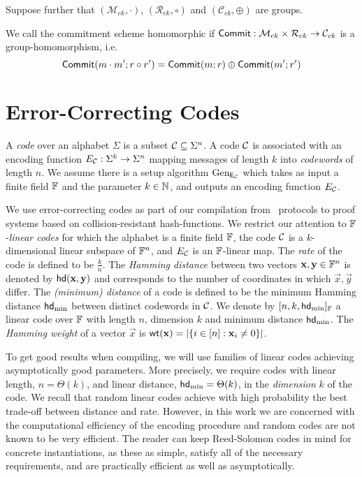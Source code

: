 Suppose further that $(\mathcal{M}_{ck},\cdot)$, $(\mathcal{R}_{ck},\circ)$ and $(\mathcal{C}_{ck},\oplus)$ are groups.
\begin{definition}
We call the commitment scheme homomorphic if $\mathsf{Commit}:\mathcal{M}_{ck}\times\mathcal{R}_{ck}\to \mathcal{C}_{ck}$ is a group-homomorphism, i.e. 
$$\mathsf{Commit}(m \cdot m';r\circ r')=\mathsf{Commit}(m;r)\oplus \mathsf{Commit}(m';r')$$
\end{definition}

\section{Error-Correcting Codes}\label{sec:LC}
A \emph{code} over an alphabet $\Sigma$ is a subset $\mathcal{C}\subseteq \Sigma^n$. A code $\mathcal{C}$ is associated with an encoding function $E_{\mathcal{C}}:\Sigma^k\to \Sigma^n$ mapping messages of length $k$ into \emph{codewords} of length $n$.
We assume there is a setup algorithm ${\text{Gen}}_{\mathsf{E}_{\mathcal{C}}}$ which takes as input a finite field $\mathbb{F}$ and the parameter $k \in \mathbb{N}$, and outputs an encoding function $E_{\mathcal{C}}$.

We use error-correcting codes as part of our compilation from \ILC\ protocols to proof systems based on collision-resistant hash-functions. We restrict our attention to $\mathbb{F}$-\emph{linear codes} for which the alphabet is a finite field $\mathbb{F}$, the code $\mathcal{C}$ is a $k$-dimensional linear subspace of $\mathbb{F}^n$, and $E_{\mathcal{C}}$ is an $\mathbb{F}$-linear map. The \emph{rate} of the code is defined to be $\frac{k}{n}$. The \emph{Hamming distance} between two vectors $\mathbf{x},\mathbf{y} \in \mathbb{F}^n$ is denoted by $\mathsf{hd}(\mathbf{x},\mathbf{y})$ and corresponds to the number of coordinates in which $\vec{x},\vec{y}$ differ. The \emph{(minimum) distance} of a code is defined to be the minimum Hamming distance $\mathsf{hd}_{\mathrm{min}}$ between distinct codewords in $\mathcal{C}$. %
We denote by $[n,k,\mathsf{hd}_{\mathrm{min}}]_{\mathbb{F}}$ a linear code over $\mathbb{F}$ with length $n$, dimension $k$ and minimum distance $\mathsf{hd}_{\mathrm{min}}$. The \emph{Hamming weight} of a vector $\vec{x}$ is $\mathsf{wt}(\mathbf{x})=|\{i \in [n]: \mathbf{x}_i \neq 0\}|$.


To get good results when compiling, we will use families of linear codes achieving asymptotically good parameters. More precisely, we require codes with linear length, $n=\Theta(k)$, and linear distance, $\mathsf{hd}_{\mathrm{min}}=\Theta(k)$, in the \emph{dimension} $k$ of the code.
We recall that random linear codes achieve with high probability the best trade-off between distance and rate. However, in this work we are concerned with the computational efficiency of the encoding procedure and random codes are not known to be very efficient. The reader can keep Reed-Solomon codes in mind for concrete instantiations, as these as simple, satisfy all of the necessary requirements, and are practically efficient as well as asymptotically.